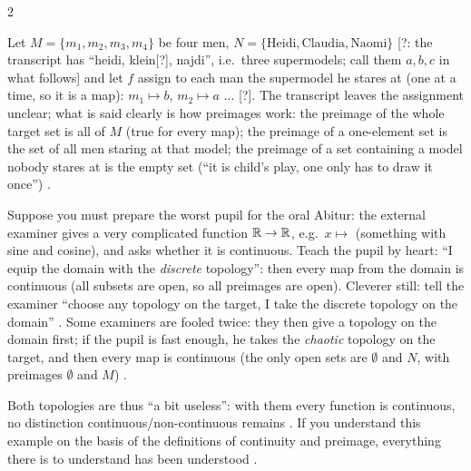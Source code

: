 \begin{paracol}{2}
\begin{example}\label{ex:tm-supermodels}
Let $M=\{m_1,m_2,m_3,m_4\}$ be four men, $N=\{\text{Heidi},\text{Claudia},\text{Naomi}\}$ [?: the transcript has
``heidi, klein[?], najdi'', i.e.\ three supermodels; call them $a,b,c$ in what follows] and let $f$ assign to each man
the supermodel he stares at (one at a time, so it is a map): $m_1\mapsto b$, $m_2\mapsto a$ ... [?]. The transcript
leaves the assignment unclear; what is said clearly is how preimages work: the preimage of the whole target set is
all of $M$ (true for every map); the preimage of a one-element set is the set of all men staring at that model; the
preimage of a set containing a model nobody stares at is the empty set (``it is child's play, one only has to draw it
once'') .
\end{example}

\begin{example}\label{ex:tm-abitur}
Suppose you must prepare the worst pupil for the oral Abitur: the external examiner gives a very complicated function
$\mathbb{R}\to\mathbb{R}$, e.g.\ $x\mapsto$ (something with sine and cosine), and asks whether it is continuous. Teach the pupil by
heart: ``I equip the domain with the \emph{discrete} topology'': then every map from the domain is continuous (all subsets
are open, so all preimages are open). Cleverer still: tell the examiner ``choose any topology on the target, I take the
discrete topology on the domain'' .
Some examiners are fooled twice: they then give a topology on the domain first; if the pupil is fast enough, he takes the
\emph{chaotic} topology on the target, and then every map is continuous (the only open sets are $\emptyset$ and $N$, with
preimages $\emptyset$ and $M$) .\par
Both topologies are thus ``a bit useless'': with them every function is continuous, no distinction
continuous/non-continuous remains . If you understand this example on the
basis of the definitions of continuity and preimage, everything there is to understand has been understood
.
\end{example}


\end{paracol}
